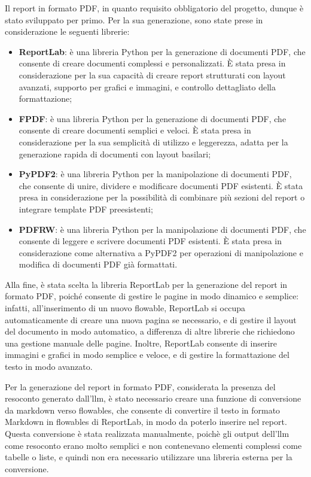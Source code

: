 Il report in formato PDF, in quanto requisito obbligatorio del progetto, dunque è stato sviluppato per primo. Per la sua generazione, sono state prese in considerazione le seguenti librerie:
\begin{itemize}
    \item \textbf{ReportLab}: è una libreria Python per la generazione di documenti PDF, che consente di creare documenti complessi e personalizzati. È stata presa in considerazione per la sua capacità di creare report strutturati con layout avanzati, supporto per grafici e immagini, e controllo dettagliato della formattazione;
    \item \textbf{FPDF}: è una libreria Python per la generazione di documenti PDF, che consente di creare documenti semplici e veloci. È stata presa in considerazione per la sua semplicità di utilizzo e leggerezza, adatta per la generazione rapida di documenti con layout basilari;
    \item \textbf{PyPDF2}: è una libreria Python per la manipolazione di documenti PDF, che consente di unire, dividere e modificare documenti PDF esistenti. È stata presa in considerazione per la possibilità di combinare più sezioni del report o integrare template PDF preesistenti;
    \item \textbf{PDFRW}: è una libreria Python per la manipolazione di documenti PDF, che consente di leggere e scrivere documenti PDF esistenti. È stata presa in considerazione come alternativa a PyPDF2 per operazioni di manipolazione e modifica di documenti PDF già formattati.
\end{itemize}

Alla fine, è stata scelta la libreria ReportLab per la generazione del report in formato PDF, poiché consente di gestire le pagine in modo dinamico e semplice: infatti, all'inserimento di un nuovo flowable, ReportLab si occupa automaticamente di creare una nuova pagina se necessario, e di gestire il layout del documento in modo automatico, a differenza di altre librerie che richiedono una gestione manuale delle pagine. Inoltre, ReportLab consente di inserire immagini e grafici in modo semplice e veloce, e di gestire la formattazione del testo in modo avanzato.

Per la generazione del report in formato PDF, considerata la presenza del resoconto generato dall'\gls{llm}, è stato necessario creare una funzione di conversione da markdown verso flowables, che consente di convertire il testo in formato Markdown in flowables di ReportLab, in modo da poterlo inserire nel report. Questa conversione è stata realizzata manualmente, poichè gli output dell'\gls{llm} come resoconto erano molto semplici e non contenevano elementi complessi come tabelle o liste, e quindi non era necessario utilizzare una libreria esterna per la conversione.


